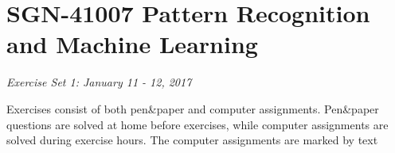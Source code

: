 \documentclass[a4paper,12pt]{scrartcl}
\newcommand{\python}{{\fbox{\texttt{\bfseries python}}\quad}}
\begin{document}
\section*{\bf SGN-41007 Pattern Recognition and Machine Learning}
\emph{Exercise Set 1: January 11 - 12, 2017}
\bigskip
\sloppy


\lstset{language=Python,style=mystyle} 


\noindent
Exercises consist of both pen\&paper and computer assignments.
Pen\&paper questions are solved at home before exercises, while
computer assignments are solved during exercise hours. The
computer assignments are marked by text \python
\end{document}
